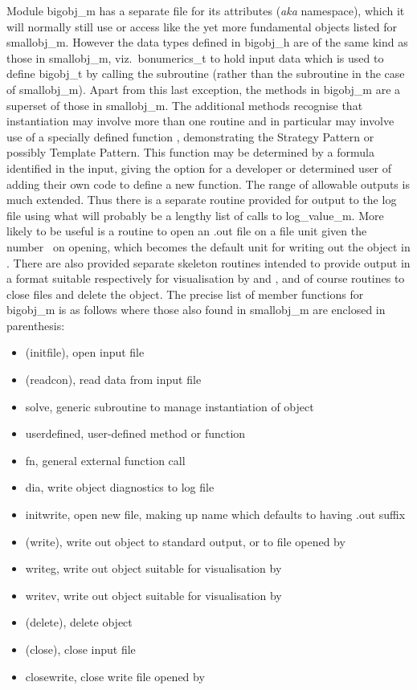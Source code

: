 Module bigobj\_m has a separate file for its attributes (\emph{aka} namespace), which it will
normally still use or access
like the yet more fundamental objects listed for smallobj\_m. However the data types
defined in bigobj\_h are of the same kind as those in smallobj\_m, viz.\ bonumerics\_t
to hold input data which is used to define bigobj\_t by calling the  subroutine
(rather than the subroutine  in the case of smallobj\_m). Apart from
this last  exception, the methods in bigobj\_m are a superset of those in smallobj\_m.
The additional methods recognise that instantiation may involve
more than one routine and in particular may involve use of a specially defined
function , demonstrating the Strategy Pattern or possibly Template Pattern.
This function may be determined by a formula identified in the input,
giving  the option for a developer or determined user of adding their own code to define
a new function. The range of allowable outputs is much extended. Thus there
is a separate routine provided for output to the log file using what will
probably be a lengthy list of calls to log\_value\_m. More likely to be useful  is a routine
to open an .out file on a file unit given the number~ on opening, which
becomes the default unit for writing out the object in .
There are also provided separate skeleton routines intended to provide output
in a format suitable respectively for visualisation by  and ,
and of course routines to close files and delete the object.
The precise list of member functions for bigobj\_m is as follows
where those also found in smallobj\_m are enclosed in parenthesis:
\begin{itemize}
\item (initfile),  open input file
\item (readcon),  read data from input file
\item solve,  generic subroutine to manage instantiation of object
\item userdefined,  user-defined method or function
\item fn, general external function call
\item dia, write object diagnostics to log file
\item initwrite, open new file, making up name which defaults to having .out suffix
\item (write), write out object to standard output, or to file opened by 
\item writeg, write out object suitable for  visualisation by 
\item writev, write out object suitable for  visualisation by  
\item (delete), delete object
\item (close), close input file
\item closewrite,  close write file opened by 
\end{itemize}

